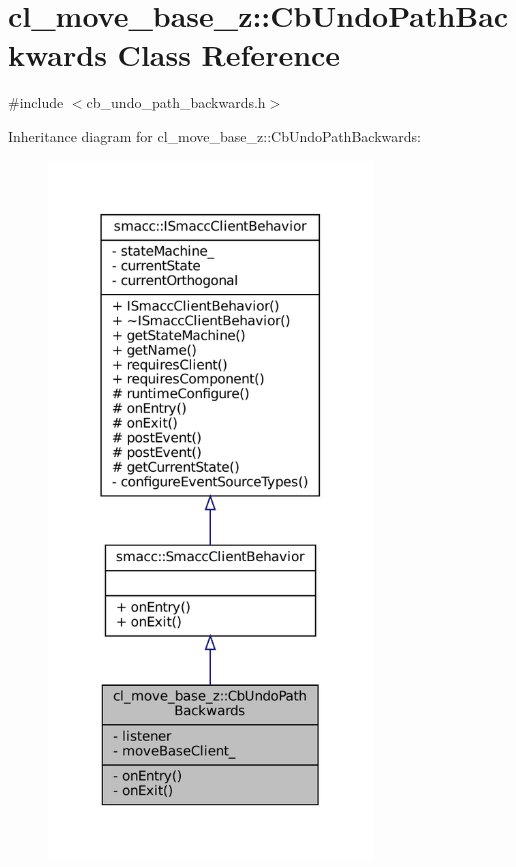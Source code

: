 \hypertarget{classcl__move__base__z_1_1CbUndoPathBackwards}{}\section{cl\+\_\+move\+\_\+base\+\_\+z\+:\+:Cb\+Undo\+Path\+Backwards Class Reference}
\label{classcl__move__base__z_1_1CbUndoPathBackwards}


{\ttfamily \#include $<$cb\+\_\+undo\+\_\+path\+\_\+backwards.\+h$>$}



Inheritance diagram for cl\+\_\+move\+\_\+base\+\_\+z\+:\+:Cb\+Undo\+Path\+Backwards\+:
\nopagebreak
\begin{figure}[H]
\begin{center}
\leavevmode
\includegraphics[width=244pt]{classcl__move__base__z_1_1CbUndoPathBackwards__inherit__graph}
\end{center}
\end{figure}


